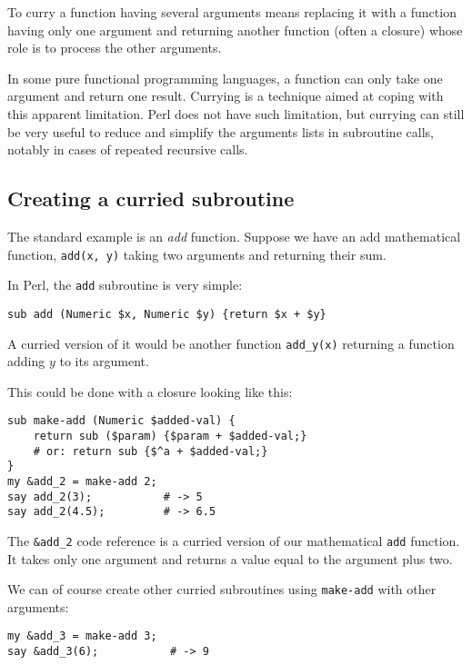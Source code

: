 To curry a function having several arguments means replacing 
it with a function having only one argument and returning 
another function (often a closure) whose role is to 
process the other arguments.

In some pure functional programming languages, a function 
can only take one argument and return one result. Currying 
is a technique aimed at coping with this apparent limitation. 
Perl does not have such limitation, but currying can still 
be very useful to reduce and simplify the arguments lists 
in subroutine calls, notably in cases of repeated recursive 
calls.


\subsection{Creating a curried subroutine}

The standard example is an \emph{add} function. Suppose 
we have an add mathematical function, \verb'add(x, y)' 
taking two arguments and returning their sum. 

In Perl, the {\tt add} subroutine is very simple:

\begin{verbatim}
sub add (Numeric $x, Numeric $y) {return $x + $y}
\end{verbatim}

A curried version of it would be another function 
\verb'add_y(x)' returning a function adding $y$ to 
its argument.

This could be done with a closure looking like this:

\begin{verbatim}
sub make-add (Numeric $added-val) {
    return sub ($param) {$param + $added-val;}    
    # or: return sub {$^a + $added-val;}
}
my &add_2 = make-add 2;
say add_2(3);           # -> 5
say add_2(4.5);         # -> 6.5
\end{verbatim}

The \verb'&add_2' code reference is a curried version 
of our mathematical {\tt add} function. It takes only 
one argument and returns a value equal to the argument 
plus two.

We can of course create other curried subroutines using 
{\tt make-add} with other arguments:

\begin{verbatim}
my &add_3 = make-add 3;
say &add_3(6);           # -> 9
\end{verbatim}

